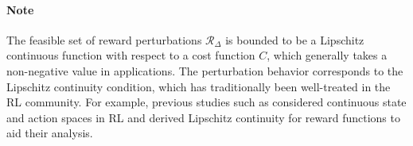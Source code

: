 \paragraph{Note}The feasible set of reward perturbations $\mathcal{R}_{\Delta}$ is bounded to be a Lipschitz continuous function with respect to a cost function $C$, which generally takes a non-negative value in applications. 
The perturbation behavior corresponds to the Lipschitz continuity condition, which has traditionally been well-treated in the RL community. For example, previous studies such as \cite{Rachelson2010OnTL, Pirotta2015PolicyGI} considered continuous state and action spaces in RL and derived Lipschitz continuity for reward functions to aid their analysis. 

